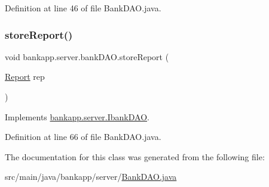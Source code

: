 Definition at line 46 of file Bank\+D\+A\+O.\+java.

\mbox{\label{classbankapp_1_1server_1_1bank_d_a_o_a1909f3eb0622fb32291c0d1969bdf5df}} 
\subsubsection{\texorpdfstring{store\+Report()}{storeReport()}}
{\footnotesize\ttfamily void bankapp.\+server.\+bank\+D\+A\+O.\+store\+Report (\begin{DoxyParamCaption}\item[{\hyperlink{classbankapp_1_1server_1_1_report}{Report}}]{rep }\end{DoxyParamCaption})}



Implements \hyperlink{interfacebankapp_1_1server_1_1_ibank_d_a_o_a8990d1f4e0ffb741d459cebe172e47e0}{bankapp.\+server.\+Ibank\+D\+AO}.



Definition at line 66 of file Bank\+D\+A\+O.\+java.



The documentation for this class was generated from the following file\+:\begin{DoxyCompactItemize}
\item 
src/main/java/bankapp/server/\hyperlink{_bank_d_a_o_8java}{Bank\+D\+A\+O.\+java}\end{DoxyCompactItemize}
